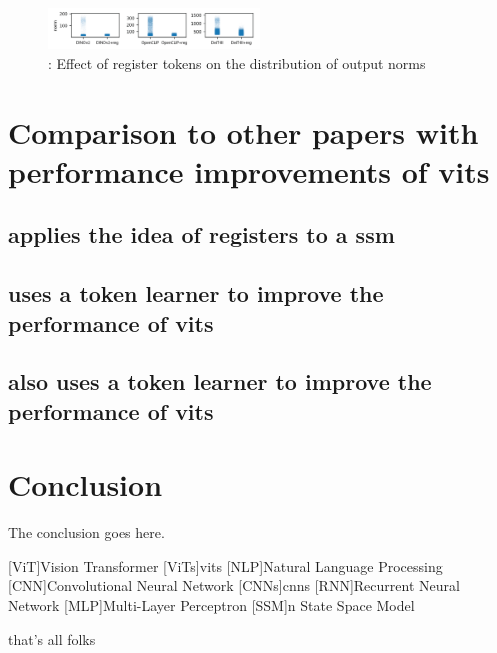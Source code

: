 \documentclass[conference]{IEEEtran}
\begin{document}
  \begin{figure}
    \centering
    \includegraphics[width=0.5\textwidth]{figures/register-norm-result.png}
    \caption{: Effect of register tokens on the distribution of output norms \cite{registers}}
    \label{fig:register-norm-result}
  \end{figure}


  \section{Comparison to other papers with performance improvements of \ac{vit}s}

  \subsection{\cite{mamba-needs-registers} applies the idea of registers to a \ac{ssm}}

  \subsection{\cite{sum-tokens-to-registers} uses a token learner to improve the performance of \ac{vit}s}

  \subsection{\cite{token-learner} also uses a token learner to improve the performance of \ac{vit}s}


  \section{Conclusion}
  The conclusion goes here.

  \printbibliography

  \begin{acronym}
    [ViT]{Vision Transformer}
    [ViTs]{\ac{vit}s}
    [NLP]{Natural Language Processing}
    [CNN]{Convolutional Neural Network}
    [CNNs]{\acp{cnn}}
    [RNN]{Recurrent Neural Network}
    [MLP]{Multi-Layer Perceptron}
    [SSM]{n State Space Model}
  \end{acronym}


that's all folks
\end{document}
